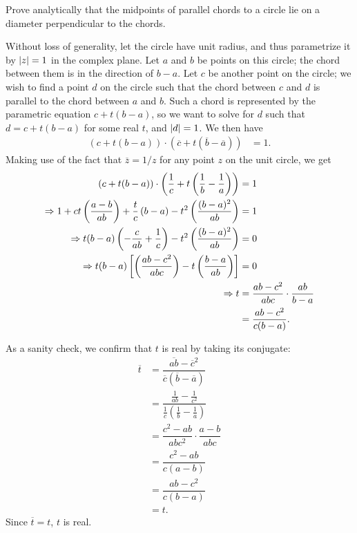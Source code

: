 \begin{exercise}
	Prove analytically that the midpoints of parallel chords to a circle lie on a diameter perpendicular to the chords.
	
	\begin{sol}
		Without loss of generality, let the circle have unit radius, and thus parametrize it by $\lvert z \rvert=1$ in the complex plane. Let $a$ and $b$ be points on this circle; the chord between them is in the direction of $b-a$. Let $c$ be another point on the circle; we wish to find a point $d$ on the circle such that the chord between $c$ and $d$ is parallel to the chord between $a$ and $b$. Such a chord is represented by the parametric equation $c+t(b-a)$, so we want to solve for $d$ such that $d=c+t(b-a)$ for some real $t$, and $\lvert d \rvert=1$. We then have
		\begin{align*}
			\left(c+t(b-a)\right) \cdot \left(\overline{c}+t(\overline{b}-\overline{a})\right) &=1.
		\end{align*}
		Making use of the fact that $\overline{z}=1/z$ for any point $z$ on the unit circle, we get
		\begin{align*}
			\left(c+t(b-a)\right)\cdot \left(\dfrac{1}{c}+t\left(\dfrac{1}{b}-\dfrac{1}{a}\right)\right) &=1 \\
			\Rightarrow 1+ct\left(\dfrac{a-b}{ab}\right)+\dfrac{t}{c}\left(b-a\right)-t^2\left(\dfrac{(b-a)^2}{ab}\right) &=1 \\
			\Rightarrow t(b-a)\left(-\dfrac{c}{ab}+\dfrac{1}{c}\right)-t^2\left(\dfrac{(b-a)^2}{ab}\right) &=0 \\
			\Rightarrow t(b-a)\left[\left(\dfrac{ab-c^2}{abc}\right)-t\left(\dfrac{b-a}{ab}\right)\right] &=0 \\
			\Rightarrow t &=\dfrac{ab-c^2}{abc} \cdot \dfrac{ab}{b-a} \\
			&=\dfrac{ab-c^2}{c(b-a)}.
		\end{align*}
		
		As a sanity check, we confirm that $t$ is real by taking its conjugate:
		\begin{align*}
			\overline{t} &=\dfrac{\overline{ab}-\overline{c}^2}{\overline{c}(\overline{b}-\overline{a})} \\
			&=\dfrac{\frac{1}{ab}-\frac{1}{c^2}}{\frac{1}{c}\left(\frac{1}{b}-\frac{1}{a}\right)} \\
			&=\dfrac{c^2-ab}{abc^2} \cdot \dfrac{a-b}{abc} \\
			&=\dfrac{c^2-ab}{c(a-b)} \\
			&=\dfrac{ab-c^2}{c(b-a)} \\
			&=t.
		\end{align*}
		Since $\overline{t}=t$, $t$ is real.
		

\end{sol}
\end{exercise}
